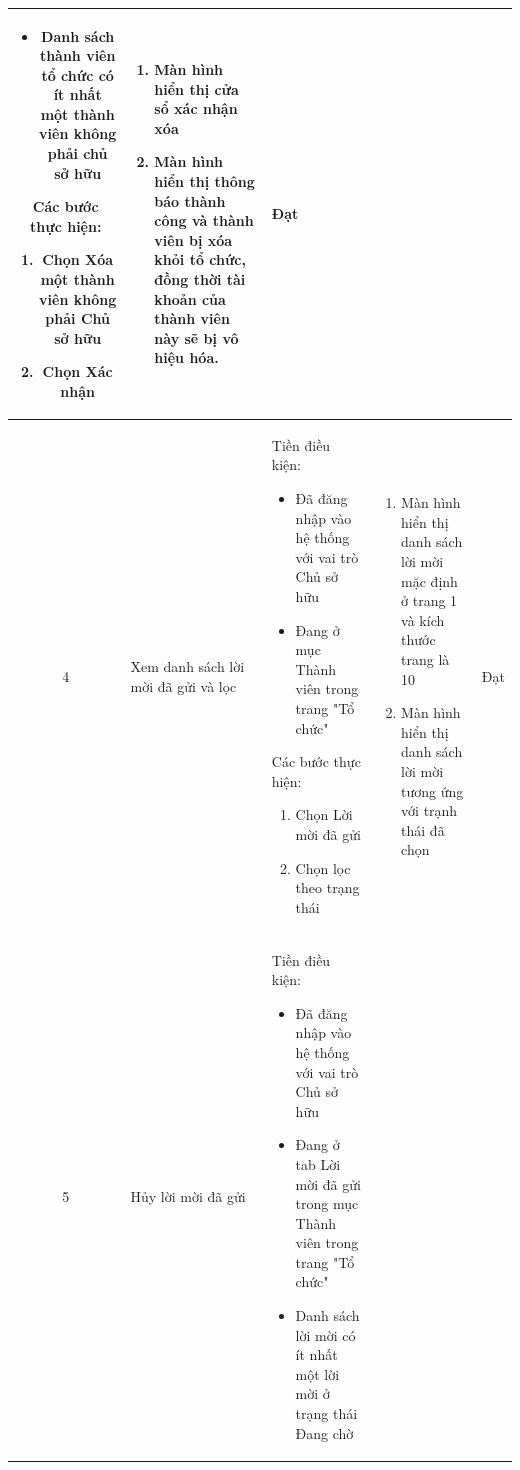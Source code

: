 \begin{longtable}{|c|m{2.5cm}|m{5.5cm}|m{4.5cm}|c|}
\begin{itemize}
        \item Danh sách thành viên tổ chức có ít nhất một thành viên không phải chủ sở hữu
    \end{itemize}
    Các bước thực hiện: 
    \begin{enumerate}[label=\arabic*.]
        \item Chọn Xóa một thành viên không phải Chủ sở hữu
        \item Chọn Xác nhận
    \end{enumerate}
    & 
    \begin{enumerate}[label=\arabic*.]
        \item Màn hình hiển thị cửa sổ xác nhận xóa
        \item Màn hình hiển thị thông báo thành công và thành viên bị xóa khỏi tổ chức, đồng thời tài khoản của thành viên này sẽ bị vô hiệu hóa.
    \end{enumerate}  & Đạt \\
    \hline
    4 & 
    Xem danh sách lời mời đã gửi và lọc & 
    Tiền điều kiện:
    \begin{itemize}
        \item Đã đăng nhập vào hệ thống với vai trò Chủ sở hữu
        \item Đang ở mục Thành viên trong trang "Tổ chức"
    \end{itemize}
    Các bước thực hiện: 
    \begin{enumerate}[label=\arabic*.]
        \item Chọn Lời mời đã gửi
        \item Chọn lọc theo trạng thái
    \end{enumerate}
    & 
    \begin{enumerate}[label=\arabic*.]
        \item Màn hình hiển thị danh sách lời mời mặc định ở trang 1 và kích thước trang là 10
        \item Màn hình hiển thị danh sách lời mời tương ứng với trạnh thái đã chọn
    \end{enumerate}  & Đạt \\
    \hline
    5 & 
    Hủy lời mời đã gửi & 
    Tiền điều kiện:
    \begin{itemize}
        \item Đã đăng nhập vào hệ thống với vai trò Chủ sở hữu
        \item Đang ở tab Lời mời đã gửi trong mục Thành viên trong trang "Tổ chức"
        \item Danh sách lời mời có ít nhất một lời mời ở trạng thái Đang chờ

\end{itemize}
\end{longtable}
